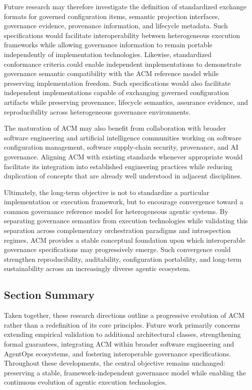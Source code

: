 \documentclass[10pt]{article}
\begin{document}
Future research may therefore investigate the definition of standardized exchange formats for governed configuration items, semantic projection interfaces, governance evidence, provenance information, and lifecycle metadata. Such specifications would facilitate interoperability between heterogeneous execution frameworks while allowing governance information to remain portable independently of implementation technologies. Likewise, standardized conformance criteria could enable independent implementations to demonstrate governance semantic compatibility with the ACM reference model while preserving implementation freedom. Such specifications would also facilitate independent implementations capable of exchanging governed configuration artifacts while preserving provenance, lifecycle semantics, assurance evidence, and reproducibility across heterogeneous governance environments.

The maturation of ACM may also benefit from collaboration with broader software engineering and artificial intelligence communities working on software configuration management, software supply-chain security, provenance, and AI governance. Aligning ACM with existing standards whenever appropriate would facilitate its integration into established engineering practices while reducing duplication of concepts that are already well understood in adjacent disciplines.

Ultimately, the long-term objective is not to standardize a particular implementation or execution framework, but to encourage convergence toward a common governance reference model for heterogeneous agentic systems. By separating governance semantics from execution technologies while validating this separation across complementary orchestration paradigms and introspection regimes, ACM provides a stable conceptual foundation upon which interoperable governance specifications may progressively emerge. Such convergence could strengthen reproducibility, auditability, configuration portability, and long-term sustainability across an increasingly diverse agentic ecosystem.

\subsection*{Section Summary}

Taken together, these research directions outline a progressive evolution of ACM rather than a redefinition of its core principles. Future work primarily concerns extending empirical validation to additional architectural classes, strengthening formal guarantees, integrating ACM within broader software engineering and AgentOps ecosystems, and fostering interoperable governance specifications. Throughout these developments, the central objective remains unchanged: preserving a stable, framework-independent governance model while enabling the continuous evolution of agentic execution technologies.
\end{document}

